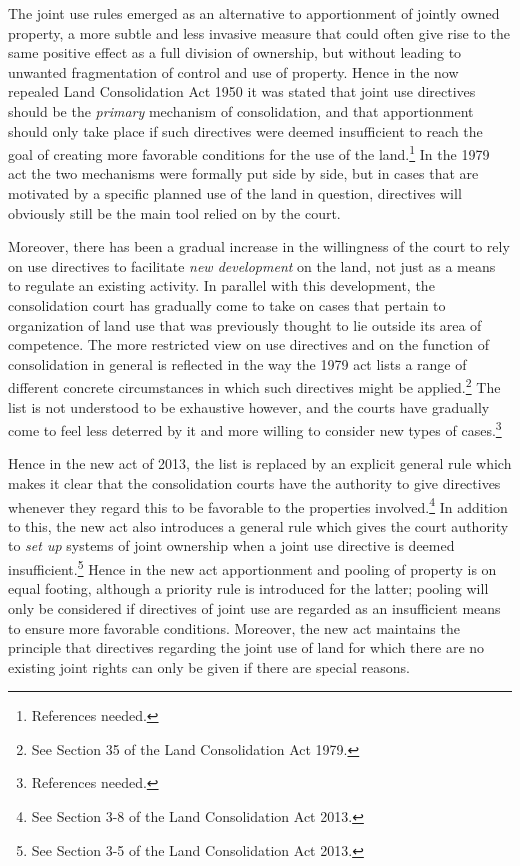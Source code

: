 \documentclass[10pt]{article} %
\begin{document}
The joint use rules emerged as an alternative to apportionment of jointly owned property, a more subtle and less invasive measure that could often give rise to the same positive effect as a full division of ownership, but without leading to unwanted fragmentation of control and use of property. Hence in the now repealed Land Consolidation Act 1950 it was stated that joint use directives should be the \emph{primary} mechanism of consolidation, and that apportionment should only take place if such directives were deemed insufficient to reach the goal of creating more favorable conditions for the use of the land.\footnote{References needed.} In the 1979 act the two mechanisms were formally put side by side, but in cases that are motivated by a specific planned use of the land in question, directives will obviously still be the main tool relied on by the court.

Moreover, there has been a gradual increase in the willingness of the court to rely on use directives to facilitate \emph{new development} on the land, not just as a means to regulate an existing activity. In parallel with this development, the consolidation court has gradually come to take on cases that pertain to organization of land use that was previously thought to lie outside its area of competence. The more restricted view on use directives and on the function of consolidation in general is reflected in the way the 1979 act lists a range of different concrete circumstances in which such directives might be applied.\footnote{See Section 35 of the Land Consolidation Act 1979.} The list is not understood to be exhaustive however, and the courts have gradually come to feel less deterred by it and more willing to consider new types of cases.\footnote{References needed.}

Hence in the new act of 2013, the list is replaced by an explicit general rule which makes it clear that the  consolidation courts have the authority to give directives whenever they regard this to be favorable to the properties involved.\footnote{See Section 3-8 of the Land Consolidation Act 2013.} In addition to this, the new act also introduces a general rule which gives the court authority to \emph{set up} systems of joint ownership when a joint use directive is deemed insufficient.\footnote{See Section 3-5 of the Land Consolidation Act 2013.} Hence in the new act apportionment and pooling of property is on equal footing, although a priority rule is introduced for the latter; pooling will only be considered if directives of joint use are regarded as an insufficient means to ensure more favorable conditions. Moreover, the new act maintains the principle that directives regarding the joint use of land for which there are no existing joint rights can only be given if there are special reasons.
\end{document}
